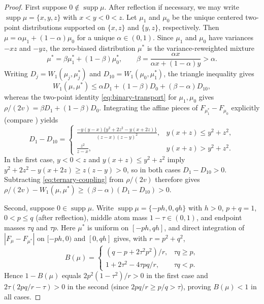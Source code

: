 \documentclass[11pt]{article}
\numberwithin{equation}{section}
\theoremstyle{remark}
\DeclareMathOperator{\supp}{supp}
\begin{document}
\begin{proof}
First suppose $0\notin\supp\mu$. After reflection if necessary, we may write
$\supp\mu=\{x,y,z\}$ with $x<y<0<z$. Let $\mu_1$ and $\mu_0$ be the unique
centered two-point distributions supported on $\{x,z\}$ and $\{y,z\}$,
respectively. Then $\mu=\alpha\mu_1+(1-\alpha)\mu_0$ for a unique
$\alpha\in(0,1)$. Since $\mu_1$ and $\mu_0$ have variances $-xz$ and $-yz$,
the zero-biased distribution $\mu^*$ is the variance-reweighted mixture
\citep[Theorem~2.1]{Goldstein2010}
\[
 \mu^*=\beta\mu_1^*+(1-\beta)\mu_0^*,\qquad
 \beta=\frac{\alpha x}{\alpha x+(1-\alpha)y}>\alpha.
\]
Writing $D_j=W_1(\mu_j,\mu_j^*)$ and $D_{10}=W_1(\mu_0,\mu_1^*)$, the
triangle inequality gives
\begin{equation}\label{eq:ternary-coupling}
 W_1(\mu,\mu^*)
 \le\alpha D_1+(1-\beta)D_0+(\beta-\alpha)D_{10},
\end{equation}
whereas the two-point identity \eqref{eq:binary-transport} for $\mu_1,\mu_0$
gives $\rho/(2v)=\beta D_1+(1-\beta)D_0$. Integrating the affine pieces of
$F_{\mu_1^*}-F_{\mu_0}$ explicitly (compare \citet[Lemma~3.1 and eq.~(28)]{Goldstein2010})
yields
\[
 D_1-D_{10}=
 \begin{cases}
 \displaystyle
 \frac{-y(y-x)\{y^2+2z^2-y(x+2z)\}}{(z-x)(z-y)^2},
       &y(x+z)\le y^2+z^2,\\[2ex]
 \displaystyle\frac{z^2}{z-x},&y(x+z)>y^2+z^2.
 \end{cases}
\]
In the first case, $y<0<z$ and $y(x+z)\le y^2+z^2$ imply
$y^2+2z^2-y(x+2z)\ge z(z-y)>0$, so
in both cases $D_1-D_{10}>0$. Subtracting \eqref{eq:ternary-coupling} from
$\rho/(2v)$ therefore gives $\rho/(2v)-W_1(\mu,\mu^*)\ge(\beta-\alpha)(D_1-D_{10})>0$.

Second, suppose $0\in\supp\mu$. Write $\supp\mu=\{-ph,0,qh\}$ with $h>0$,
$p+q=1$, $0<p\le q$ (after reflection), middle atom mass $1-\tau\in(0,1)$,
and endpoint masses $\tau q$ and $\tau p$. Here $\mu^*$ is uniform on
$[-ph,qh]$, and direct integration of $|F_\mu-F_{\mu^*}|$ on $[-ph,0)$ and
$[0,qh]$ gives, with $r=p^2+q^2$,
\begin{equation}\label{eq:zero-middle}
 B(\mu)=
 \begin{cases}
 (q-p+2\tau^2p^2)/r,&\tau q\ge p,\\
 1+2\tau^2-4\tau pq/r,&\tau q<p.
 \end{cases}
\end{equation}
Hence $1-B(\mu)$ equals $2p^2(1-\tau^2)/r>0$ in the first case and
$2\tau(2pq/r-\tau)>0$ in the second (since $2pq/r\ge p/q>\tau$), proving
$B(\mu)<1$ in all cases.
\end{proof}
\end{document}
